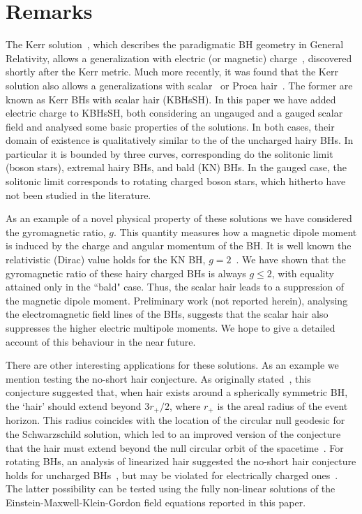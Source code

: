 \section{Remarks}
\label{sec_remarks}

The Kerr solution~\cite{Kerr:1963ud}, which describes the paradigmatic BH geometry in General Relativity, allows a generalization with electric (or magnetic) charge~\cite{Newman:1965my}, discovered shortly after the Kerr metric. Much more recently, it was found that the Kerr solution also allows a generalizations with scalar~\cite{Herdeiro:2014goa,Herdeiro:2015gia,Kleihaus:2015iea,Herdeiro:2015tia,Chodosh:2015oma} or Proca hair~\cite{Herdeiro:2016tmi}. The former are known as Kerr BHs with scalar hair (KBHsSH). In this paper we have added electric charge to KBHsSH, both considering an ungauged and a gauged scalar field and analysed some basic properties of the solutions. In both cases, their domain of existence is qualitatively similar to the of the uncharged hairy BHs. In particular it is bounded by three curves, corresponding do the solitonic limit (boson stars), extremal hairy BHs, and bald (KN) BHs. In the gauged case, the solitonic limit corresponds to rotating charged boson stars, which hitherto have not been studied in the literature. 

As an example of a novel physical property of these solutions we have considered the gyromagnetic ratio, $g$. This quantity measures how a magnetic dipole moment is induced by the charge and angular momentum of the BH. It is well known the relativistic (Dirac) value holds for the KN BH, $g=2$~\cite{Carter:1968rr}. We have shown that the gyromagnetic ratio of these hairy charged BHs is always $g\leqslant 2$, with equality attained only in the ``bald" case. Thus, the scalar hair leads to a suppression of the magnetic dipole moment. Preliminary work (not reported herein), analysing the electromagnetic field lines of the BHs, suggests that the scalar hair also suppresses the higher electric multipole moments. We hope to give a detailed account of this behaviour in the near future.




There are other interesting applications for these solutions. As an example we mention testing the no-short hair conjecture. As originally stated~\cite{Nunez:1996xv}, this conjecture suggested that, when hair exists around a spherically symmetric BH, the `hair' should extend
beyond $3r_+/2$, where $r_+$ is the areal radius of the event horizon. This radius coincides with the location of the
circular null geodesic for the Schwarzschild solution, which led to an improved version of the conjecture that the hair must extend beyond the null circular orbit of the spacetime~\cite{Hod:2011aa}. For rotating BHs, an analysis of linearized hair suggested the no-short hair conjecture holds for uncharged BHs~\cite{Hod:2016dkn}, but may be violated for electrically charged ones~\cite{Hod:2014sha,Hod:2015ynd}. The latter possibility can be tested using the fully non-linear solutions of the Einstein-Maxwell-Klein-Gordon field equations reported in this paper. 








